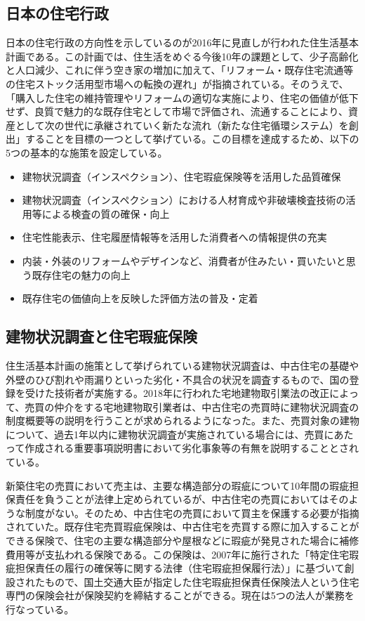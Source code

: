 \documentclass[a4paper,fontsize=11pt,report,notitlepage,line_length=38zw,number_of_lines=40,dvipdfmx]{jlreq}
\begin{document}
\subsection{日本の住宅行政}
日本の住宅行政の方向性を示しているのが2016年に見直しが行われた住生活基本計画である\cite{juseikatsu}。この計画では、住生活をめぐる今後10年の課題として、少子高齢化と人口減少、これに伴う空き家の増加に加えて、「リフォーム・既存住宅流通等の住宅ストック活用型市場への転換の遅れ」が指摘されている。そのうえで、「購入した住宅の維持管理やリフォームの適切な実施により、住宅の価値が低下せず、良質で魅力的な既存住宅として市場で評価され、流通することにより、資産として次の世代に承継されていく新たな流れ（新たな住宅循環システム）を創出」することを目標の一つとして挙げている。この目標を達成するため、以下の5つの基本的な施策を設定している。
\begin{itemize}
\item 建物状況調査（インスペクション）、住宅瑕疵保険等を活用した品質確保
\item 建物状況調査（インスペクション）における人材育成や非破壊検査技術の活用等による検査の質の確保・向上
\item 住宅性能表示、住宅履歴情報等を活用した消費者への情報提供の充実
\item 内装・外装のリフォームやデザインなど、消費者が住みたい・買いたいと思う既存住宅の魅力の向上
\item 既存住宅の価値向上を反映した評価方法の普及・定着
\end{itemize}

\subsection{建物状況調査と住宅瑕疵保険}
住生活基本計画の施策として挙げられている建物状況調査は、中古住宅の基礎や外壁のひび割れや雨漏りといった劣化・不具合の状況を調査するもので、国の登録を受けた技術者が実施する。2018年に行われた宅地建物取引業法の改正によって、売買の仲介をする宅地建物取引業者は、中古住宅の売買時に建物状況調査の制度概要等の説明を行うことが求められるようになった。また、売買対象の建物について、過去1年以内に建物状況調査が実施されている場合には、売買にあたって作成される重要事項説明書において劣化事象等の有無を説明することとされている\cite{takuchitatemono}。

新築住宅の売買において売主は、主要な構造部分の瑕疵について10年間の瑕疵担保責任を負うことが法律上定められているが、中古住宅の売買においてはそのような制度がない。そのため、中古住宅の売買において買主を保護する必要が指摘されていた。既存住宅売買瑕疵保険は、中古住宅を売買する際に加入することができる保険で、住宅の主要な構造部分や屋根などに瑕疵が発見された場合に補修費用等が支払われる保険である。この保険は、2007年に施行された「特定住宅瑕疵担保責任の履行の確保等に関する法律（住宅瑕疵担保履行法）」に基づいて創設されたもので、国土交通大臣が指定した住宅瑕疵担保責任保険法人という住宅専門の保険会社が保険契約を締結することができる。現在は5つの法人が業務を行なっている。
\end{document}
